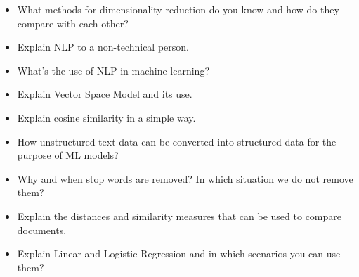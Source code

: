 \documentclass{article}
\begin{document}
\begin{itemize}
	\item What methods for dimensionality reduction do you know and how do they compare with each other?
	\item Explain NLP to a non-technical person.
	\item What's the use of NLP in machine learning?
	\item Explain Vector Space Model and its use.
	\item Explain cosine similarity in a simple way.
	\item How unstructured text data can be converted into structured data for the purpose of ML models?
	\item Why and when stop words are removed? In which situation we do not remove them?
	\item Explain the distances and similarity measures that can be used to compare documents.
	\item Explain Linear and Logistic Regression and in which scenarios you can use them?
\end{itemize}
\end{document}

